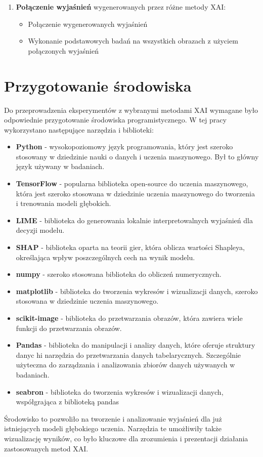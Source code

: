 \begin{enumerate}
	\item \textbf{Połączenie wyjaśnień} wygenerowanych przez różne metody XAI:
	      \begin{itemize}
		      \item Połączenie wygenerowanych wyjaśnień
		      \item Wykonanie podstawowych badań na wszystkich obrazach z użyciem połączonych wyjaśnień
	      \end{itemize}

\end{enumerate}

\section*{Przygotowanie środowiska}

Do przeprowadzenia eksperymentów z wybranymi metodami XAI wymagane było odpowiednie przygotowanie środowiska programistycznego.
W tej pracy wykorzystano  następujące narzędzia i biblioteki:
\begin{itemize}
	\item \textbf{Python} - wysokopoziomowy język programowania, który jest szeroko stosowany w dziedzinie nauki o danych i uczenia maszynowego.
	      Był to główny język używany w badaniach.
	\item \textbf{TensorFlow} - popularna biblioteka open-source do uczenia maszynowego, która jest szeroko stosowana w dziedzinie uczenia maszynowego do tworzenia i trenowania modeli głębokich.
	\item \textbf{LIME} - biblioteka do generowania lokalnie interpretowalnych wyjaśnień dla decyzji modelu.
	\item \textbf{SHAP} - biblioteka oparta na teorii gier, która oblicza wartości Shapleya, określająca wpływ poszczególnych cech na wynik modelu.
	\item \textbf{numpy} - szeroko stosowana biblioteka do obliczeń numerycznych.
	\item \textbf{matplotlib} - biblioteka do tworzenia wykresów i wizualizacji danych, szeroko stosowana w dziedzinie uczenia maszynowego.
	\item \textbf{scikit-image} - biblioteka do przetwarzania obrazów, która zawiera wiele funkcji do przetwarzania obrazów.
	\item \textbf{Pandas} - biblioteka do manipulacji i analizy danych, które oferuje struktury danyc hi narzędzia do przetwarzania danych tabelarycznych.
	      Szczególnie użyteczna do zarządzania i analizowania zbiorów danych używanych w badaniach.
	\item \textbf{seabron} - biblioteka do tworzenia wykresów i wizualizacji danych, współgrająca z biblioteką pandas
\end{itemize}
Środowisko to pozwoliło na tworzenie i analizowanie wyjaśnień dla już istniejących modeli głębokiego uczenia.
Narzędzia te umożłiwiły także wizualizację wyników, co było kluczowe dla zrozumienia i prezentacji działania zastosowanych metod XAI.


